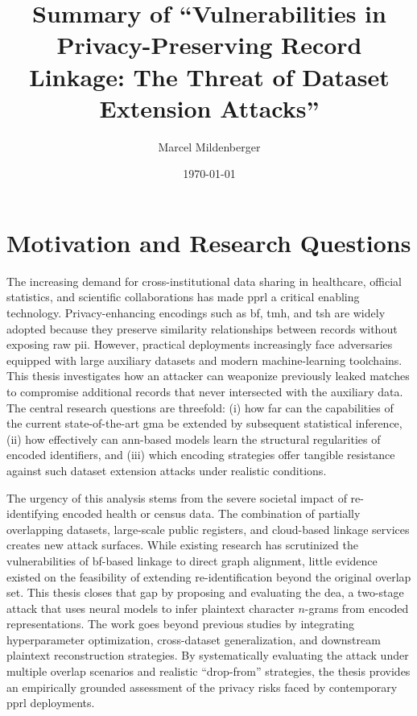 \documentclass[a4paper,11pt]{scrartcl}
\title{Summary of ``Vulnerabilities in Privacy-Preserving Record Linkage: The Threat of Dataset Extension Attacks''}
\author{Marcel Mildenberger}
\date{\today}
\begin{document}
\maketitle

\section{Motivation and Research Questions}
The increasing demand for cross-institutional data sharing in healthcare, official statistics, and scientific collaborations has made \ac{pprl} a critical enabling technology. Privacy-enhancing encodings such as \ac{bf}, \ac{tmh}, and \ac{tsh} are widely adopted because they preserve similarity relationships between records without exposing raw \ac{pii}. However, practical deployments increasingly face adversaries equipped with large auxiliary datasets and modern machine-learning toolchains. This thesis investigates how an attacker can weaponize previously leaked matches to compromise additional records that never intersected with the auxiliary data. The central research questions are threefold: (i) how far can the capabilities of the current state-of-the-art \ac{gma} be extended by subsequent statistical inference, (ii) how effectively can \ac{ann}-based models learn the structural regularities of encoded identifiers, and (iii) which encoding strategies offer tangible resistance against such dataset extension attacks under realistic conditions.

The urgency of this analysis stems from the severe societal impact of re-identifying encoded health or census data. The combination of partially overlapping datasets, large-scale public registers, and cloud-based linkage services creates new attack surfaces. While existing research has scrutinized the vulnerabilities of \ac{bf}-based linkage to direct graph alignment, little evidence existed on the feasibility of extending re-identification beyond the original overlap set. This thesis closes that gap by proposing and evaluating the \ac{dea}, a two-stage attack that uses neural models to infer plaintext character $n$-grams from encoded representations. The work goes beyond previous studies by integrating hyperparameter optimization, cross-dataset generalization, and downstream plaintext reconstruction strategies. By systematically evaluating the attack under multiple overlap scenarios and realistic ``drop-from'' strategies, the thesis provides an empirically grounded assessment of the privacy risks faced by contemporary \ac{pprl} deployments.
\end{document}

